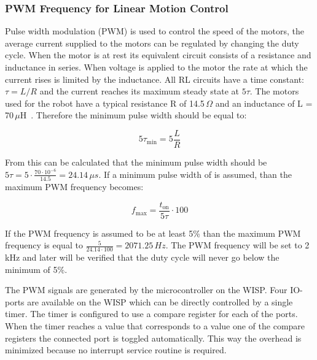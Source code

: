 \subsubsection{PWM Frequency for Linear Motion Control}

Pulse width modulation (PWM) is used to control the speed of the motors, the average current supplied to the motors can be regulated by changing the duty cycle.
When the motor is at rest its equivalent circuit consists of a resistance and inductance in series.
When voltage is applied to the motor the rate at which the current rises is limited by the inductance. 
All RL circuits have a time constant: $\tau = L / R$ and the current reaches its maximum steady state at $5\tau$. 
The motors used for the robot have a typical resistance R of 14.5\,$\Omega$ and an inductance of L = 70\,$\mu$H~\cite{gearmotor_206-110_2017}.
Therefore the minimum pulse width should be equal to:

\begin{equation}
5\tau_{\min} = 5 \frac{L}{R} 
\end{equation}

From this can be calculated that the minimum pulse width should be $5\tau = 5 \cdot \frac{70 \cdot 10^{-6}}{14.5} = 24.14\,\mu s$.
If a minimum pulse width of is assumed, than the maximum PWM frequency becomes:

\begin{equation}
f_{\max} = \frac{t_{\text{on}}}{5\tau}\cdot 100
\end{equation}

If the PWM frequency is assumed to be at least 5\% than the maximum PWM frequency is equal to $\frac{5}{24.14 \cdot 100} = 2071.25\,Hz$.
The PWM frequency will be set to 2\,kHz and later will be verified that the duty cycle will never go below the minimum of 5\%.

The PWM signals are generated by the microcontroller on the WISP.
Four IO-ports are available on the WISP which can be directly controlled by a single timer.
The timer is configured to use a compare register for each of the ports.
When the timer reaches a value that corresponds to a value one of the compare registers the connected port is toggled automatically.
This way the overhead is minimized because no interrupt service routine is required.

